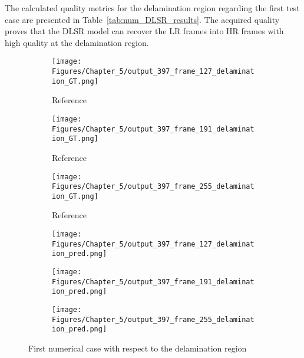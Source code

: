 The calculated quality metrics for the delamination region regarding the first test case are presented in Table~\ref{tab:num_DLSR_results}.
The acquired quality proves that the DLSR model can recover the LR frames into HR frames with high quality at the delamination region.

\begin{figure} [!ht]
	\centering
	\begin{subfigure}[b]{.32\textwidth}
		\centering
		\texttt{[image: Figures/Chapter\_5/output\_397\_frame\_127\_delamination\_GT.png]}
		\caption{Reference}
		\label{fig:ref_397_damage_127}
	\end{subfigure}
	\begin{subfigure}[b]{.32\textwidth}
		\centering
		\texttt{[image: Figures/Chapter\_5/output\_397\_frame\_191\_delamination\_GT.png]}
		\caption{Reference}
		\label{fig:ref_397_damage_191}
	\end{subfigure}
	\begin{subfigure}[b]{.32\textwidth}
		\centering
		\texttt{[image: Figures/Chapter\_5/output\_397\_frame\_255\_delamination\_GT.png]}
		\caption{Reference}
		\label{fig:ref_397_damage_255}	
	\end{subfigure}
	\begin{subfigure}[b]{.32\textwidth}
		\centering
		\texttt{[image: Figures/Chapter\_5/output\_397\_frame\_127\_delamination\_pred.png]}
		\caption{}
		\label{fig:pred_397_damage_127}
	\end{subfigure}
	\begin{subfigure}[b]{.32\textwidth}
		\centering
		\texttt{[image: Figures/Chapter\_5/output\_397\_frame\_191\_delamination\_pred.png]}
		\caption{}
		\label{fig:pred_397_damage_191}
	\end{subfigure}
	\begin{subfigure}[b]{.32\textwidth}
		\centering
		\texttt{[image: Figures/Chapter\_5/output\_397\_frame\_255\_delamination\_pred.png]}
		\caption{}
		\label{fig:pred_397_damage_255}	
	\end{subfigure}
	\caption{First numerical case with respect to the delamination region}
	\label{fig:num_results_CS_damage_area_397}
\end{figure}



